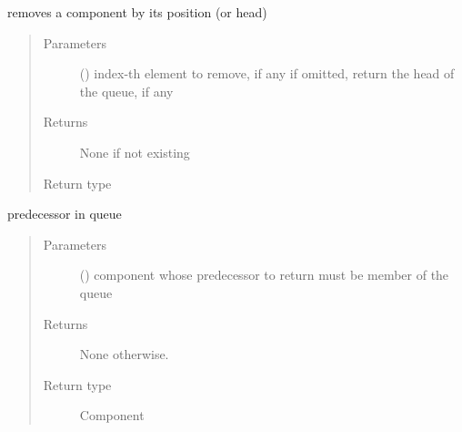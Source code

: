 \documentclass[letterpaper,10pt,english]{sphinxmanual}
\begin{document}
\begin{fulllineitems}

\begin{fulllineitems}
\label{\detokenize{Reference:salabim.Queue.pop}}
removes a component by its position (or head)
\begin{quote}\begin{description}
\item[{Parameters}] \leavevmode
{} () \textendash{} index-th element to remove, if any 
if omitted, return the head of the queue, if any

\item[{Returns}] \leavevmode
{} \textendash{} None if not existing

\item[{Return type}] \leavevmode
{\hyperref[\detokenize{Reference:salabim.Component}]{}}

\end{description}\end{quote}

\end{fulllineitems}


\begin{fulllineitems}
\label{\detokenize{Reference:salabim.Queue.predecessor}}
predecessor in queue
\begin{quote}\begin{description}
\item[{Parameters}] \leavevmode
{} ({\hyperref[\detokenize{Reference:salabim.Component}]{}}) \textendash{} component whose predecessor to return 
must be member of the queue

\item[{Returns}] \leavevmode
{} \textendash{} None otherwise.

\item[{Return type}] \leavevmode
Component 

\end{description}\end{quote}

\end{fulllineitems}


\end{fulllineitems}
\end{document}
